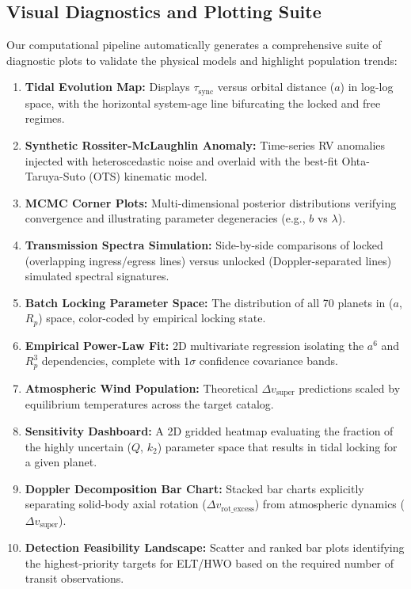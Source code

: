 \documentclass[a4paper,11pt]{article}
\numberwithin{equation}{section}
\begin{document}
\subsection{Visual Diagnostics and Plotting Suite}
Our computational pipeline automatically generates a comprehensive suite of diagnostic plots to validate the physical models and highlight population trends:
\begin{enumerate}[label=\arabic*.]
    \item \textbf{Tidal Evolution Map:} Displays $\tau_{\text{sync}}$ versus orbital distance ($a$) in log-log space, with the horizontal system-age line bifurcating the locked and free regimes.
    \item \textbf{Synthetic Rossiter-McLaughlin Anomaly:} Time-series RV anomalies injected with heteroscedastic noise and overlaid with the best-fit Ohta-Taruya-Suto (OTS) kinematic model.
    \item \textbf{MCMC Corner Plots:} Multi-dimensional posterior distributions verifying convergence and illustrating parameter degeneracies (e.g., $b$ vs $\lambda$).
    \item \textbf{Transmission Spectra Simulation:} Side-by-side comparisons of locked (overlapping ingress/egress lines) versus unlocked (Doppler-separated lines) simulated spectral signatures.
    \item \textbf{Batch Locking Parameter Space:} The distribution of all 70 planets in ($a$, $R_p$) space, color-coded by empirical locking state.
    \item \textbf{Empirical Power-Law Fit:} 2D multivariate regression isolating the $a^6$ and $R_p^3$ dependencies, complete with $1\sigma$ confidence covariance bands.
    \item \textbf{Atmospheric Wind Population:} Theoretical $\Delta v_{\text{super}}$ predictions scaled by equilibrium temperatures across the target catalog.
    \item \textbf{Sensitivity Dashboard:} A 2D gridded heatmap evaluating the fraction of the highly uncertain ($Q$, $k_2$) parameter space that results in tidal locking for a given planet.
    \item \textbf{Doppler Decomposition Bar Chart:} Stacked bar charts explicitly separating solid-body axial rotation ($\Delta v_{\text{rot\_excess}}$) from atmospheric dynamics ($\Delta v_{\text{super}}$).
    \item \textbf{Detection Feasibility Landscape:} Scatter and ranked bar plots identifying the highest-priority targets for ELT/HWO based on the required number of transit observations.
\end{enumerate}
\end{document}
